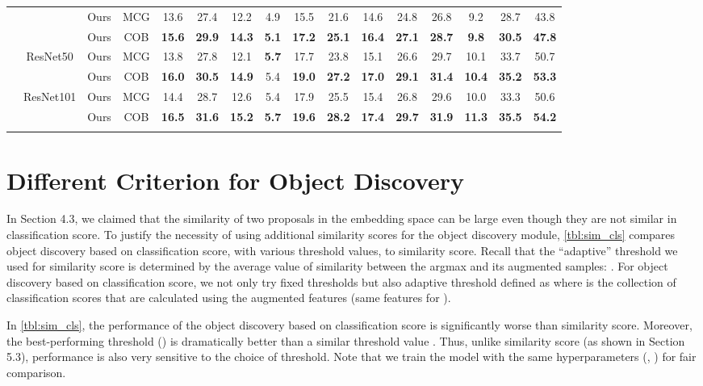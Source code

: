 \documentclass[runningheads]{llncs}
\begin{document}
\begin{table*}[ht!]
{\begin{tabular}{c|c|c|c|c|cc|ccc|ccc|ccc}
 &                              &Ours  &MCG
 &13.6 &27.4 &12.2 &4.9 &15.5 &21.6 &14.6 &24.8 &26.8 &9.2 &28.7 &43.8 \\
 &         &Ours &COB
 &\textbf{15.6} &\textbf{29.9} &\textbf{14.3} &\textbf{5.1} &\textbf{17.2} &\textbf{25.1} &\textbf{16.4} &\textbf{27.1}
 &\textbf{28.7} &\textbf{9.8} &\textbf{30.5} &\textbf{47.8} \\
\cline{2-16}
 &\multirow{2}{*}{ResNet50}       &Ours &MCG &13.8 &27.8 &12.1 &\textbf{5.7} &17.7 &23.8 &15.1 &26.6 &29.7 &10.1 &33.7 &50.7\\
 &               &Ours &COB 
 &\textbf{16.0} &\textbf{30.5} &\textbf{14.9} &5.4 &\textbf{19.0} &\textbf{27.2} &\textbf{17.0} &\textbf{29.1}
 &\textbf{31.4} &\textbf{10.4} &\textbf{35.2} &\textbf{53.3}\\
\cline{2-16}
 &\multirow{2}{*}{ResNet101}      &Ours &MCG &14.4 &28.7 &12.6 &5.4 &17.9 &25.5 &15.4 &26.8 &29.6 &10.0 &33.3 &50.6\\
 &               &Ours &COB &\textbf{16.5} &\textbf{31.6} &\textbf{15.2} &\textbf{5.7} &\textbf{19.6} &\textbf{28.2} &\textbf{17.4} &\textbf{29.7} &\textbf{31.9} &\textbf{11.3} &\textbf{35.5} &\textbf{54.2}\\
 \Xhline{2\arrayrulewidth}
\end{tabular}}
\label{tbl:proposal_coco}
\end{table*}

\section{Different Criterion for Object Discovery}
\label{sec:performance_cls_sim}
In Section 4.3, we claimed that the similarity of two proposals in the embedding space can be large even though they are not similar in classification score.
To justify the necessity of using additional similarity scores for the object discovery module, \cref{tbl:sim_cls} compares object discovery based on classification score, with various threshold values, to similarity score.
Recall that the ``adaptive'' threshold we used for similarity score is determined by the average value of similarity between the argmax and its augmented samples: . 
For object discovery based on classification score, we not only try fixed thresholds but also adaptive threshold defined as  where  is the collection of classification scores that are calculated using the augmented features (same features for    ).

In \cref{tbl:sim_cls}, the performance of the object discovery based on classification score is significantly worse than similarity score.
Moreover,
the best-performing threshold  () is dramatically better than a similar threshold value .
Thus, unlike similarity score (as shown in Section 5.3), performance is also very sensitive to the choice of threshold.
Note that we train the model with the same hyperparameters (, ) for fair comparison.
\end{document}
